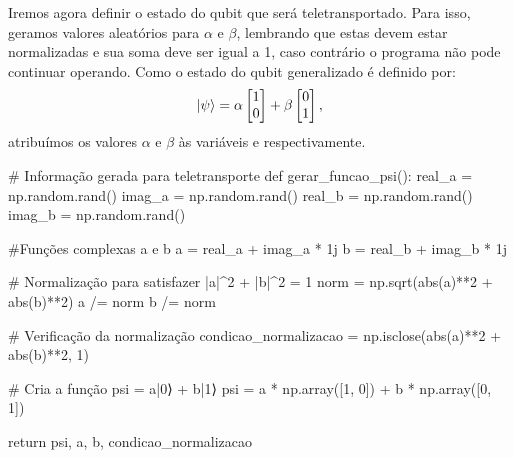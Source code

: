 Iremos agora definir o estado do qubit que será teletransportado. Para isso, geramos valores aleatórios para \(\alpha\) e \(\beta\), lembrando que estas devem estar normalizadas e sua soma deve ser igual a 1, caso contrário o programa não pode continuar operando. Como o estado do qubit generalizado é definido por:
\[ \ket{\psi} =
  \alpha \begin{bmatrix} 1 \\ 0 \end{bmatrix} +
  \beta \begin{bmatrix} 0 \\ 1 \end{bmatrix},
\]
atribuímos os valores \(\alpha\) e \(\beta\) às variáveis  e  respectivamente.
\begin{pycode}
# Informação gerada para teletransporte
def gerar_funcao_psi():
    real_a = np.random.rand()  
    imag_a = np.random.rand()  
    real_b = np.random.rand()  
    imag_b = np.random.rand()  
    
    #Funções complexas a e b
    a = real_a + imag_a * 1j
    b = real_b + imag_b * 1j
    
    # Normalização para satisfazer |a|^2 + |b|^2 = 1
    norm = np.sqrt(abs(a)**2 + abs(b)**2)
    a /= norm
    b /= norm
    
    # Verificação da normalização
    condicao_normalizacao = np.isclose(abs(a)**2 + abs(b)**2, 1)
    
    # Cria a função psi = a|0⟩ + b|1⟩
    psi = a * np.array([1, 0]) + b * np.array([0, 1])
    
    return psi, a, b, condicao_normalizacao
\end{pycode}

